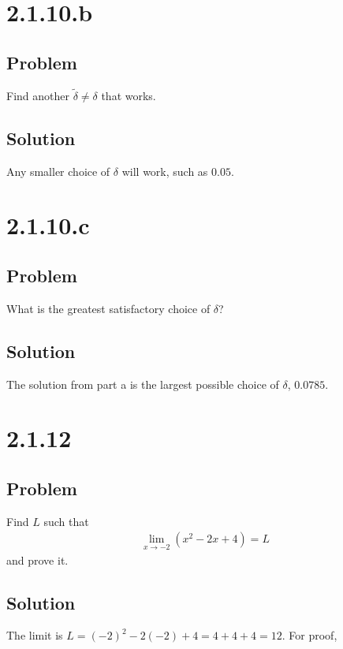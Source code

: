 \documentclass[12pt]{article}
\newcommand{\round}[1]{\left(       #1 \right)      }
\begin{document}
\section*{2.1.10.b}

\subsection*{Problem}
Find another $\tilde{\delta} \neq \delta$ that works.

\subsection*{Solution}
Any smaller choice of $\delta$ will work, such as $\boxed{0.05}$.



\section*{2.1.10.c}

\subsection*{Problem}
What is the greatest satisfactory choice of $\delta$?

\subsection*{Solution}
The solution from part a is the largest possible choice of $\delta$, $\boxed{0.0785}$.



\section*{2.1.12}

\subsection*{Problem}
Find $L$ such that
\begin{align*}
    \lim_{x \to -2} \round{x^2 - 2x + 4} = L
\end{align*}
and prove it.

\subsection*{Solution}
The limit is $L = (-2)^2 - 2(-2) + 4 = 4 + 4 + 4 = 12$. For proof,
\end{document}
